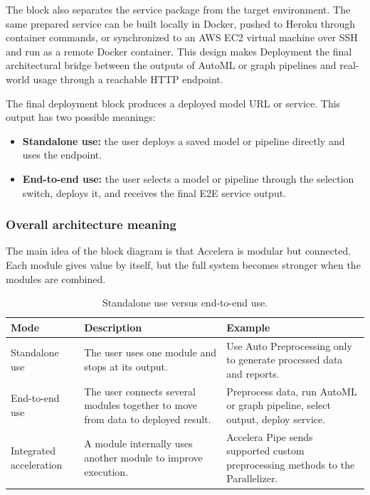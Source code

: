 \documentclass[12pt,a4paper]{report}
\newcommand{\acceleraTableStyle}{%
\small
\renewcommand{\arraystretch}{1.15}
\setlength{\tabcolsep}{4pt}%
}
\begin{document}
The block also separates the service package from the target environment. The
same prepared service can be built locally in Docker, pushed to Heroku through
container commands, or synchronized to an AWS EC2 virtual machine over SSH and
run as a remote Docker container. This design makes Deployment the final
architectural bridge between the outputs of AutoML or graph pipelines and
real-world usage through a reachable HTTP endpoint.

The final deployment block produces a deployed model URL or service. This output
has two possible meanings:

\begin{itemize}
  \item \textbf{Standalone use:} the user deploys a saved model or pipeline
  directly and uses the endpoint.
  \item \textbf{End-to-end use:} the user selects a model or pipeline through the
  selection switch, deploys it, and receives the final E2E service output.
\end{itemize}

\subsubsection*{Overall architecture meaning}

The main idea of the block diagram is that Accelera is modular but connected.
Each module gives value by itself, but the full system becomes stronger when the
modules are combined.
\begin{table}[!htbp]
\centering
\acceleraTableStyle
\caption{Standalone use versus end-to-end use.}
\label{tab:standalone-vs-e2e}
\begin{tabularx}{\textwidth}{p{}X X}
\toprule
\textbf{Mode} & \textbf{Description} & \textbf{Example} \\
\midrule

Standalone use &
The user uses one module and stops at its output. &
Use Auto Preprocessing only to generate processed data and reports. \\
\midrule

End-to-end use &
The user connects several modules together to move from data to deployed result. &
Preprocess data, run AutoML or graph pipeline, select output, deploy service. \\
\midrule

Integrated acceleration &
A module internally uses another module to improve execution. &
Accelera Pipe sends supported custom preprocessing methods to the Parallelizer. \\

\bottomrule
\end{tabularx}
\end{table}
\end{document}
